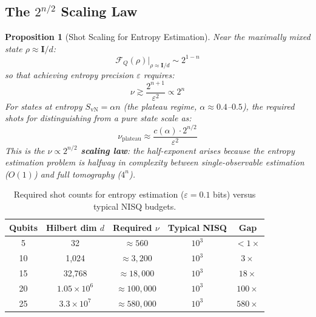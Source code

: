 \documentclass[12pt,letterpaper]{article}
\theoremstyle{plain}
\newtheorem{proposition}[theorem]{Proposition}
\theoremstyle{definition}
\theoremstyle{remark}
\newcommand{\SvN}{S_{\mathrm{vN}}}
\newcommand{\FQ}{\mathcal{F}_Q}
\begin{document}
\subsection{The $2^{n/2}$ Scaling Law}

\begin{proposition}[Shot Scaling for Entropy Estimation]
Near the maximally mixed state $\rho \approx \mathbf{I}/d$:
\begin{equation}
  \FQ(\rho)\Big|_{\rho\approx\mathbf{I}/d} \sim 2^{1-n}
  \tag{B2.2}
\end{equation}
so that achieving entropy precision $\varepsilon$ requires:
\begin{equation}
  \nu \gtrsim \frac{2^{n+1}}{\varepsilon^2}
  \propto 2^n
  \tag{B2.3}
\end{equation}
For states at entropy $\SvN = \alpha n$ (the plateau regime, $\alpha
\approx 0.4$--$0.5$), the required shots for
distinguishing from a pure state scale as:
\begin{equation}
  \nu_{\mathrm{plateau}} \approx \frac{c(\alpha)\cdot 2^{n/2}}{\varepsilon^2}
  \tag{B2.4}
  \label{eq:nu_plateau}
\end{equation}
This is the \textbf{$\nu\propto 2^{n/2}$ scaling law}: the half-exponent
arises because the entropy estimation problem is halfway in complexity
between single-observable estimation ($O(1)$) and full tomography ($4^n$).
\end{proposition}

\begin{table}[H]
\centering
\caption{Required shot counts for entropy estimation ($\varepsilon =
0.1$ bits) versus typical NISQ budgets.}
\renewcommand{\arraystretch}{1.25}
\begin{tabular}{@{}ccccc@{}}
\toprule
\textbf{Qubits} & \textbf{Hilbert dim $d$}
  & \textbf{Required $\nu$} & \textbf{Typical NISQ}
  & \textbf{Gap} \\
\midrule
5   & 32                & $\approx 560$     & $10^3$ & $<1\times$ \\
10  & 1{,}024           & $\approx 3{,}200$ & $10^3$ & $3\times$ \\
15  & 32{,}768          & $\approx 18{,}000$& $10^3$ & $18\times$ \\
20  & $1.05\times10^6$  & $\approx 100{,}000$ & $10^3$ & $100\times$ \\
25  & $3.3\times10^7$   & $\approx 580{,}000$ & $10^3$ & $580\times$ \\
\bottomrule
\end{tabular}
\label{tab:shots}
\end{table}
\end{document}
